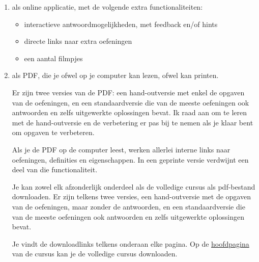 \documentclass{ximera}
\begin{document}
\begin{enumerate}
 
   \item als online applicatie, met de volgende extra functionaliteiten:
        \begin{itemize}
            \item interactieve antwoordmogelijkheden, met feedback en/of hints
            \item directe links naar extra oefeningen 
            \item een aantal filmpjes
        \end{itemize}
        
        
     \item als PDF, die je ofwel op je computer kan lezen, ofwel kan printen.
            \par
            Er zijn twee versies van de PDF: een hand-outversie met enkel de opgaven van de oefeningen, en een standaardversie die van de meeste oefeningen ook antwoorden en zelfs uitgewerkte oplossingen bevat. Ik raad aan om te leren met de hand-outversie en de verbetering er pas bij te nemen als je klaar bent om opgaven te verbeteren.
             
            Als je de PDF op de computer leest, werken allerlei interne links naar oefeningen, definities en eigenschappen. In een geprinte versie verdwijnt een deel van die functionaliteit.
            
            Je kan zowel elk afzonderlijk onderdeel als de volledige cursus als pdf-bestand downloaden. Er zijn telkens twee versies, een hand-outversie met de opgaven van de oefeningen, maar zonder de antwoorden, en een standaardversie die van de meeste oefeningen ook antwoorden en zelfs uitgewerkte oplossingen bevat.
        
            \begin{onlineOnly}
                Je vindt de downloadlinks telkens onderaan elke pagina. Op de \href{https://xerxes.ximera.org/sui/5de/Cursus_5de_1uur}{hoofdpagina} van de cursus kan je de volledige cursus downloaden.
            \end{onlineOnly}

\end{enumerate}
 
\end{document}
